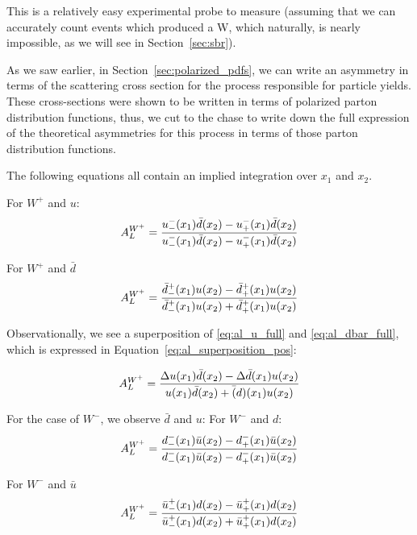 This is a relatively easy experimental probe to measure (assuming that we can
accurately count events which produced a W, which naturally, is nearly
impossible, as we will see in Section~\ref{sec:sbr}).

As we saw earlier, in Section~\ref{sec:polarized_pdfs}, we can write an
asymmetry in terms of the scattering cross section for the process responsible
for particle yields. These cross-sections were shown to be written in terms of
polarized parton distribution functions, thus, we cut to the chase to write down
the full expression of the theoretical asymmetries for this process in terms of
those parton distribution functions.

The following equations all contain an implied integration over $x_1$ and $x_2$.

For $W^+$ and $u$:
\begin{equation}
  {A_L^{W^+}} = 
  {
    {u_-^-(x_1)\bar{d}(x_2)-u_+^-(x_1)\bar{d}(x_2)}
    \over
    {u_-^-(x_1)\bar{d}(x_2)-u_+^-(x_1)\bar{d}(x_2)}
  }  
  \label{eq:al_u_full}
\end{equation}

For $W^+$ and $\bar{d}$
\begin{equation}
  {A_L^{W^+}} = 
  {
    {\bar{d}_-^+(x_1)u(x_2)-\bar{d}_+^+(x_1)u(x_2)}
    \over
    {\bar{d}_-^+(x_1)u(x_2)+\bar{d}_+^+(x_1)u(x_2)}
  }  
  \label{eq:al_dbar_full}
\end{equation}

Observationally, we see a superposition of \ref{eq:al_u_full} and
\ref{eq:al_dbar_full}, which is expressed in
Equation~\ref{eq:al_superposition_pos}:

\begin{equation}
  {A_L^{W^+}} = 
  {
    {
      \Delta u(x_1)\bar{d}(x_2)-\Delta \bar{d}(x_1)u(x_2)
    }
    \over
    {
      u(x_1)\bar d(x_2)+\bar(d)(x_1)u(x_2)
    }
  }
  \label{eq:al_superposition_pos}
\end{equation}

For the case of $W^-$, we observe $\bar{d}$ and $u$:
For $W^-$ and $d$:
\begin{equation}
  {A_L^{W^+}} = 
  {
    {d_-^-(x_1)\bar{u}(x_2)-d_+^-(x_1)\bar{u}(x_2)}
    \over
    {d_-^-(x_1)\bar{u}(x_2)-d_+^-(x_1)\bar{u}(x_2)}
  }  
  \label{eq:al_d_full}
\end{equation}

For $W^-$ and $\bar{u}$
\begin{equation}
  {A_L^{W^+}} = 
  {
    {\bar{u}_-^+(x_1)d(x_2)-\bar{u}_+^+(x_1)d(x_2)}
    \over
    {\bar{u}_-^+(x_1)d(x_2)+\bar{u}_+^+(x_1)d(x_2)}
  }  
  \label{eq:al_ubar_full}
\end{equation}

